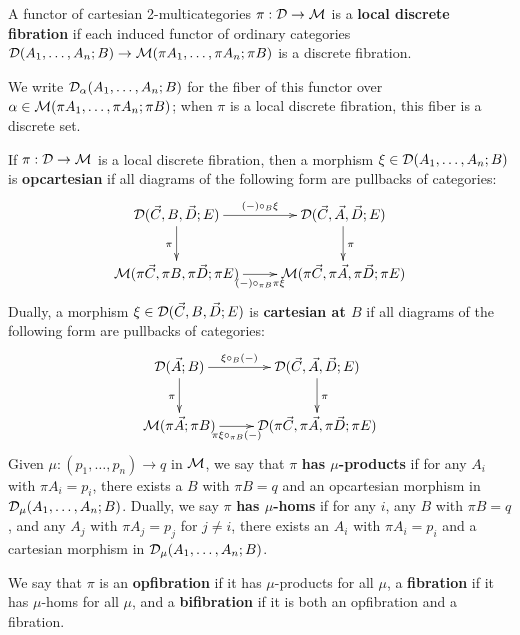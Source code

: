 \begin{definition}
  A functor of cartesian 2-multicategories $\pi:\mathcal{D}\to\mathcal{M}$ is a \textbf{local discrete fibration} if each induced functor of ordinary categories
  $\mathcal{D}(A_1,\dots,A_n;B)\to\mathcal{M}(\pi A_1,\dots,\pi A_n;\pi B)$
  is a discrete fibration.
\end{definition}

We write $\mathcal{D}_\alpha(A_1,\dots,A_n;B)$ for the fiber of this functor over
$\alpha \in \mathcal{M}(\pi A_1,\dots,\pi A_n;\pi B)$; when $\pi$ is a local discrete
fibration, this fiber is a discrete set.

\begin{definition}
  If $\pi:\mathcal{D}\to\mathcal{M}$ is a local discrete fibration, then a morphism $\xi\in\mathcal{D}(A_1,\dots,A_n;B)$ is \textbf{opcartesian} if all diagrams of the following form are pullbacks of categories:
  \[ \xymatrix{
    \cD(\vec C,B,\vec D;E) \ar[r]^-{(-)\circ_B \xi} \ar[d]_\pi &
    \cD(\vec C,\vec A,\vec D;E) \ar[d]^\pi \\
    \M(\pi\vec C,\pi B, \pi\vec D; \pi E) \ar[r]_-{(-)\circ_{\pi B} \pi\xi} &
    \M(\pi\vec C,\pi\vec A,\pi\vec D;\pi E)
  }\]
  Dually, a morphism $\xi\in\mathcal{D}(\vec C,B,\vec D;E)$ is \textbf{cartesian at $B$} if all diagrams of the following form are pullbacks of categories:
  \[ \xymatrix{
    \cD(\vec A;B) \ar[r]^-{\xi\circ_B (-)} \ar[d]_\pi &
    \cD(\vec C,\vec A,\vec D;E) \ar[d]^\pi \\
    \M(\pi\vec A;\pi B) \ar[r]_-{\pi\xi\circ_{\pi B} (-)} &
    \cD(\pi\vec C,\pi\vec A,\pi\vec D;\pi E)
  }\]
  Given $\mu:(p_1,\dots,p_n) \to q$ in $\mathcal{M}$, we say that $\pi$ \textbf{has $\mu$-products} if for any $A_i$ with $\pi A_i = p_i$, there exists a $B$ with $\pi B = q$ and an opcartesian morphism in $\mathcal{D}_\mu(A_1,\dots,A_n;B)$.
  Dually, we say $\pi$ \textbf{has $\mu$-homs} if for any $i$, any $B$ with $\pi B = q$, and any $A_j$ with $\pi A_j = p_j$ for $j\neq i$, there exists an $A_i$ with $\pi A_i = p_i$ and a cartesian morphism in $\mathcal{D}_\mu(A_1,\dots,A_n;B)$.

  We say that $\pi$ is an \textbf{opfibration} if it has $\mu$-products for all $\mu$, a \textbf{fibration} if it has $\mu$-homs for all $\mu$, and a \textbf{bifibration} if it is both an opfibration and a fibration.
\end{definition}

